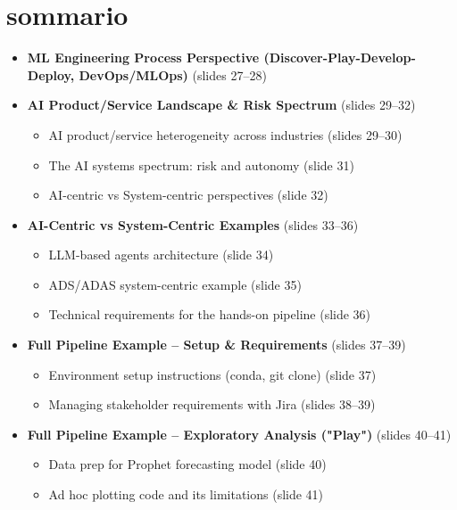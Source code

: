


\section{sommario}

\begin{itemize}
  

    \item \textbf{ML Engineering Process Perspective (Discover-Play-Develop-Deploy, DevOps/MLOps)} (slides 27--28)
    \item \textbf{AI Product/Service Landscape \& Risk Spectrum} (slides 29--32)
    \begin{itemize}
        \item AI product/service heterogeneity across industries (slides 29--30)
        \item The AI systems spectrum: risk and autonomy (slide 31)
        \item AI-centric vs System-centric perspectives (slide 32)
    \end{itemize}
    \item \textbf{AI-Centric vs System-Centric Examples} (slides 33--36)
    \begin{itemize}
        \item LLM-based agents architecture (slide 34)
        \item ADS/ADAS system-centric example (slide 35)
        \item Technical requirements for the hands-on pipeline (slide 36)
    \end{itemize}
    \item \textbf{Full Pipeline Example -- Setup \& Requirements} (slides 37--39)
    \begin{itemize}
        \item Environment setup instructions (conda, git clone) (slide 37)
        \item Managing stakeholder requirements with Jira (slides 38--39)
    \end{itemize}
    \item \textbf{Full Pipeline Example -- Exploratory Analysis ("Play")} (slides 40--41)
    \begin{itemize}
        \item Data prep for Prophet forecasting model (slide 40)
        \item Ad hoc plotting code and its limitations (slide 41)
    \end{itemize}

\end{itemize}
